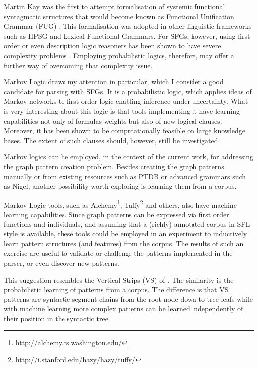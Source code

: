     Martin Kay was the first to attempt formalisation of systemic functional syntagmatic structures that would become known as Functional Unification Grammar (FUG) \citep{Kay1985}. This formalisation was adopted in other linguistic frameworks such as HPSG and Lexical Functional Grammars. For SFGs, however, using first order or even description logic reasoners has been shown to have severe complexity problems \citep{Bateman2008}. Employing probabilistic logics, therefore, may offer a further way of overcoming that complexity issue.
    
    Markov Logic \citep{Richardson2006,Domingos2010} draws my attention in particular, which I consider a good candidate for parsing with SFGs. It is a probabilistic logic, which applies ideas of Markov networks to first order logic enabling inference under uncertainty. What is very interesting about this logic is that tools implementing it have learning capabilities not only of formulas weights but also of new logical clauses. Moreover, it has been shown to be computationally feasible on large knowledge bases. The extent of such clauses should, however, still be investigated. 
    
    Markov logics can be employed, in the context of the current work, for addressing the graph pattern creation problem. Besides creating the graph patterns manually or from existing resources such as PTDB or advanced grammars such as Nigel, another possibility worth exploring is learning them from a corpus. 
    
    
    Markov Logic tools, such as Alchemy\footnote{\url{http://alchemy.cs.washington.edu/}}, Tuffy\footnote{\url{http://i.stanford.edu/hazy/hazy/tuffy/}} and others, also have machine learning capabilities. Since graph patterns can be expressed via first order functions and individuals, and assuming that a (richly) annotated corpus in SFL style is available, these tools could be employed in an experiment to inductively learn pattern structures (and features) from the corpus. The results of such an exercise are useful to validate or challenge the patterns implemented in the parser, or even discover new patterns.

    This suggestion resembles the Vertical Strips (VS) of \citet{ODonoghue1991a}. The similarity is the probabilistic learning of patterns from a corpus. The difference is that VS patterns are syntactic segment chains from the root node down to tree leafs while with machine learning more complex patterns can be learned independently of their position in the syntactic tree. %
    

